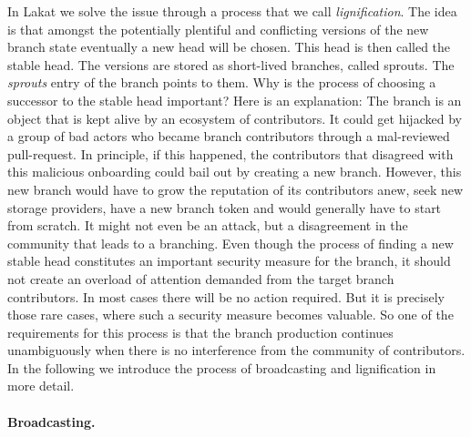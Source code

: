 \documentclass[14pt]{article}
\begin{document}
In Lakat we solve the issue through a process that we call \textit{lignification}. The idea is that amongst the potentially plentiful and conflicting versions of the new branch state eventually a new head will be chosen. This head is then called the stable head. The versions are stored as short-lived branches, called sprouts. The \textit{sprouts} entry of the branch points to them. Why is the process of choosing a successor to the stable head important? Here is an explanation: The branch is an object that is kept alive by an ecosystem of contributors. It could get hijacked by a group of bad actors who became branch contributors through a mal-reviewed pull-request. In principle, if this happened, the contributors that disagreed with this malicious onboarding could bail out by creating a new branch. However, this new branch would have to grow the reputation of its contributors anew, seek new storage providers, have a new branch token and would generally have to start from scratch. It might not even be an attack, but a disagreement in the community that leads to a branching.
Even though the process of finding a new stable head constitutes an important security measure for the branch, it should not create an overload of attention demanded from the target branch contributors. In most cases there will be no action required. But it is precisely those rare cases, where such a security measure becomes valuable. So one of the requirements for this process is that the branch production continues unambiguously when there is no interference from the community of contributors. In the following we introduce the process of broadcasting and lignification in more detail.

\paragraph{Broadcasting.}
\end{document}
